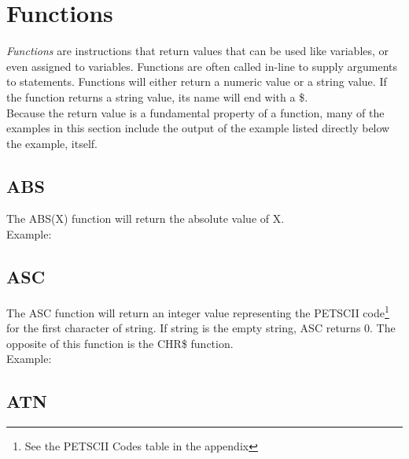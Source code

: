 \section{Functions}

\emph{Functions} are instructions that return values that can be used like
variables, or even assigned to variables.  Functions are often called in-line
to supply arguments to statements.  Functions will either return a numeric
value or a string value.  If the function returns a string value, its name will
end with a {\ttfamily \$}.\\

Because the return value is a fundamental property of a function, many of the
examples in this section include the output of the example listed directly
below the example, itself.\\

\subsection{ABS}

The {\ttfamily ABS(X)} function will return the absolute value of {\ttfamily
X}.\\

Example:\\


\subsection{ASC}

The {\ttfamily ASC} function will return an integer value representing the
PETSCII code\footnote{See the PETSCII Codes table in the appendix} for the
first character of string.  If string is the empty string, {\ttfamily ASC}
returns 0.  The opposite of this function is the {\ttfamily CHR\$} function.\\

Example:\\


\subsection{ATN}

